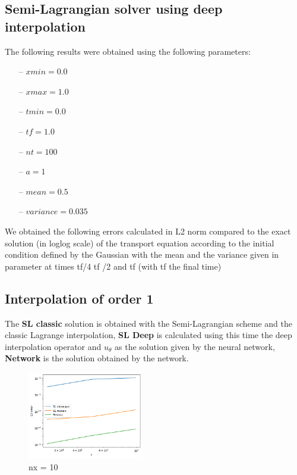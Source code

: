 \documentclass{article}
\begin{document}


\subsection{Semi-Lagrangian solver using deep interpolation}

The following results were obtained using the following parameters:

\begin{itemize}
    \item[--]$xmin = 0.0$
    \item[--] $xmax = 1.0$
    \item[--] $tmin = 0.0$
    \item[--] $tf = 1.0$
    \item[--] $nt = 100$
    \item[--] $a = 1$
    \item[--] $mean = 0.5$
    \item[--] $variance = 0.035$
\end{itemize}

We obtained the following errors calculated in L2 norm compared to the exact solution (in loglog scale) of the transport equation according to the initial condition defined by the Gaussian with the mean and the variance given in parameter at times tf/4 tf /2 and tf (with tf the final time)

\subsection{Interpolation of order 1}

The \textbf{SL classic} solution is obtained with the Semi-Lagrangian scheme and the classic Lagrange interpolation, \textbf{SL Deep} is calculated using this time the deep interpolation operator and $u_\theta $ as the solution given by the neural network, \textbf{Network} is the solution obtained by the network.\\

\begin{figure}[!h]
    \centering
    \includegraphics[width=0.45\textwidth]{images/i110.png}
    \caption{nx = 10}
\end{figure}
\end{document}
